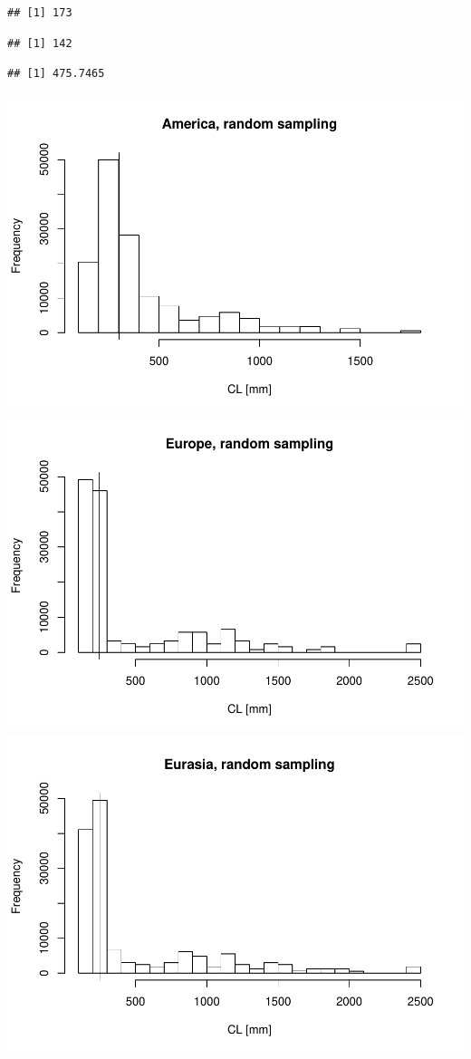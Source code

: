 \documentclass[]{article}
\begin{document}
\begin{verbatim}
## [1] 173
\end{verbatim}

\begin{verbatim}
## [1] 142
\end{verbatim}

\begin{verbatim}
## [1] 475.7465
\end{verbatim}

\includegraphics{MA_JJ_files/figure-latex/RSCon-1.pdf}
\includegraphics{MA_JJ_files/figure-latex/RSCon-2.pdf}
\includegraphics{MA_JJ_files/figure-latex/RSCon-3.pdf}
\end{document}
